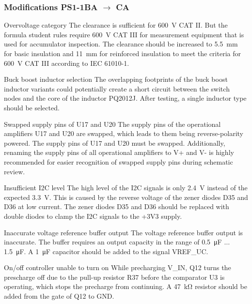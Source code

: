 \FloatBarrier

\subsubsection{Modifications PS1-1BA $\to$ CA}

\begin{ModTable}

\ModItemOpen
{Overvoltage category}
{The clearance is sufficient for \qty{600}{\volt} CAT II. But the formula student rules \cite{FSG:Rules_2026} require \qty{600}{\volt} CAT III for measurement equipment that is used for accumulator inspection. }
{The clearance should be increased to \qty{5.5}{\milli\meter} for basic insulation and \qty{11}{\milli\meter} for reinforced insulation to meet the criteria for \qty{600}{\volt} CAT III according to IEC 61010-1. }
{}
{}

\ModItemOpen
{Buck boost inductor selection}
{The overlapping footprints of the buck boost inductor variants could potentially create a short circuit between the switch nodes and the core of the inductor PQ2012J. }
{After testing, a single inductor type should be selected. }
{}
{}

\ModItemOpen
{Swapped supply pins of U17 and U20}
{The supply pins of the operational amplifiers U17 and U20 are swapped, which leads to them being reverse-polarity powered. }
{The supply pins of U17 and U20 must be swapped. \newline Additionally, renaming the supply pins of all operational amplifiers to V+ and V- is highly recommended for easier recognition of swapped supply pins during schematic review. }
{}
{}

\ModItemOpen
{Insufficient \ac{I2C} level}
{The high level of the \ac{I2C} signals is only \qty{2.4}{\volt} instead of the expected \qty{3.3}{\volt}. \newline This is caused by the reverse voltage of the zener diodes D35 and D36 at low current. }
{The zener diodes D35 and D36 should be replaced with double diodes to clamp the \ac{I2C} signals to the +3V3 supply. }
{}
{}

\ModItemOpen
{Inaccurate voltage reference buffer output}
{The voltage reference buffer output is inaccurate. The buffer requires an output capacity in the range of \qty{0.5}{\micro\farad} $\ldots$ \qty{1.5}{\micro\farad}. }
{A \qty{1}{\micro\farad} capacitor should be added to the signal VREF\_UC. }
{}
{}

\ModItemOpen
{On/off controller unable to turn on}
{While precharging V\_IN, Q12 turns the prescharge off due to the pull-up resistor R37 before the comparator U3 is operating, which stops the precharge from continuing. }
{A \qty{47}{\kilo\ohm} resistor should be added from the gate of Q12 to GND. }
{}
{}


\end{ModTable}
